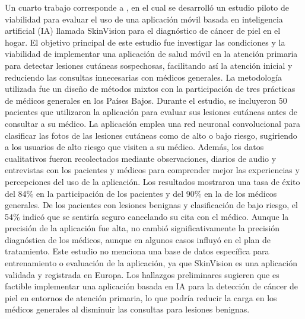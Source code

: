 Un cuarto trabajo corresponde a \parencite{smak2023}, en el cual se desarrolló un estudio piloto de viabilidad para evaluar el uso de una aplicación móvil basada en inteligencia artificial (IA) llamada SkinVision para el diagnóstico de cáncer de piel en el hogar. El objetivo principal de este estudio fue investigar las condiciones y la viabilidad de implementar una aplicación de salud móvil en la atención primaria para detectar lesiones cutáneas sospechosas, facilitando así la atención inicial y reduciendo las consultas innecesarias con médicos generales.
La metodología utilizada fue un diseño de métodos mixtos con la participación de tres prácticas de médicos generales en los Países Bajos. Durante el estudio, se incluyeron 50 pacientes que utilizaron la aplicación para evaluar sus lesiones cutáneas antes de consultar a su médico. La aplicación emplea una red neuronal convolucional para clasificar las fotos de las lesiones cutáneas como de alto o bajo riesgo, sugiriendo a los usuarios de alto riesgo que visiten a su médico. Además, los datos cualitativos fueron recolectados mediante observaciones, diarios de audio y entrevistas con los pacientes y médicos para comprender mejor las experiencias y percepciones del uso de la aplicación.
Los resultados mostraron una tasa de éxito del 84\% en la participación de los pacientes y del 90\% en la de los médicos generales. De los pacientes con lesiones benignas y clasificación de bajo riesgo, el 54\% indicó que se sentiría seguro cancelando su cita con el médico. Aunque la precisión de la aplicación fue alta, no cambió significativamente la precisión diagnóstica de los médicos, aunque en algunos casos influyó en el plan de tratamiento.
Este estudio no menciona una base de datos específica para entrenamiento o evaluación de la aplicación, ya que SkinVision es una aplicación validada y registrada en Europa. Los hallazgos preliminares sugieren que es factible implementar una aplicación basada en IA para la detección de cáncer de piel en entornos de atención primaria, lo que podría reducir la carga en los médicos generales al disminuir las consultas para lesiones benignas.

